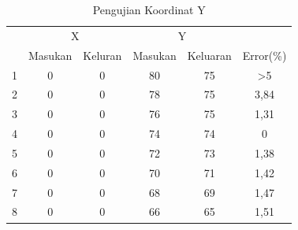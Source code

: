 \begin{longtable}{|c|c|c|c|c|c|}
	\caption{Pengujian Koordinat Y}
	\label{tbl.y}\\
	\hline
	\rowcolor[HTML]{9B9B9B} 
	\cellcolor[HTML]{9B9B9B}                     & \multicolumn{2}{c|}{\cellcolor[HTML]{9B9B9B}X} & \multicolumn{2}{c|}{\cellcolor[HTML]{9B9B9B}Y} & \cellcolor[HTML]{9B9B9B}                           \\ \cline{2-5}
	\rowcolor[HTML]{9B9B9B} 
	\multirow{-2}{*}{\cellcolor[HTML]{9B9B9B}No} & Masukan                & Keluran               & Masukan               & Keluaran               & \multirow{-2}{*}{\cellcolor[HTML]{9B9B9B}Error(\%)} \\ \hline
	\endfirsthead
	\endhead
	1                                            & 0                      & 0                     & 80                    & 75                     & >5                                               \\ \hline
	2                                            & 0                      & 0                     & 78                    & 75                     & 3,84                                       \\ \hline
	3                                            & 0                      & 0                     & 76                    & 75                     & 1,31                                       \\ \hline
	4                                            & 0                      & 0                     & 74                    & 74                     & 0                                                  \\ \hline
	5                                            & 0                      & 0                     & 72                    & 73                     & 1,38                                     \\ \hline
	6                                            & 0                      & 0                     & 70                    & 71                     & 1,42                                       \\ \hline
	7                                            & 0                      & 0                     & 68                    & 69                     & 1,47                                       \\ \hline
	8                                            & 0                      & 0                     & 66                    & 65                     & 1,51                                        \\ \hline

\end{longtable}
